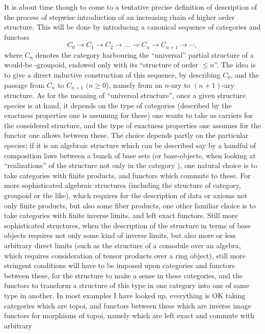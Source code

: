 \label{sec:5}%
It is about time though to come to a tentative precise definition of
description of the process of stepwise introduction of an increasing
chain of higher order structure. This will be done by introducing a
canonical sequence of categories and functors
\[ C_0 \to C_1 \to C_2 \to \dots \to C_n \to C_{n+1} \to \cdots,\]
where $C_n$ denotes the category harbouring the ``universal''
partial structure of a would-be \oo-groupoid, endowed only with its
``structure of order $\le n$''. The idea is to give a direct inductive
construction of this sequence, by describing $C_0$, and the passage
from $C_n$ to $C_{n+1}$ $(n\ge0$), namely from an $n$-ary to
$(n+1)$-ary structure. As for the meaning of ``universal structure'',
once a given structure species is at hand, it depends on the type of
categories (described by the exactness properties one is assuming for
these) one wants to take as carriers for the considered structure, and
the type of exactness properties one assumes for the functor one
allows between these. The choice depends partly on the particular
species; if it is an algebraic structure which can be described say by
a handful of composition laws between a bunch of base sets (or
base-objects, when looking at ``realizations'' of the structure not
only in the category \Sets), one natural choice is to take categories
with finite products, and functors which commute to these. For more
sophisticated algebraic structures (including the structure of
category, groupoid or the like), which requires for the description of
data or axioms not only finite products, but also some fiber products,
one other familiar choice is to take categories with finite inverse
limits, and left exact functors. Still more sophisticated structures,
when the description of the structure in terms of base objects
requires not only some kind of inverse limits, but also more or less
arbitrary direct limits (such as the structure of a comodule over an
algebra, which requires consideration of tensor products over a ring
object), still more
stringent conditions will have to be imposed upon categories and
functors between these, for the structure to make a sense in these
categories, and the functors to transform a structure of this type in
one category into one of same type in another. In most examples I have
looked up, everything is OK taking categories which are topoi, and
functors between these which are inverse image functors for morphisms
of topoi, namely which are left exact and commute with arbitrary
